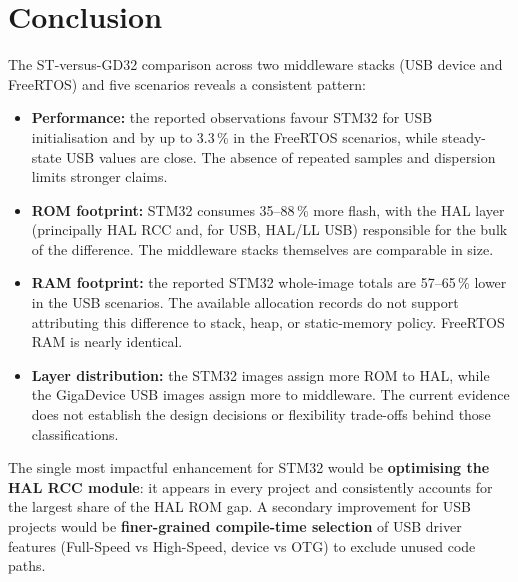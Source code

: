 \section*{Conclusion}

The ST-versus-GD32 comparison across two middleware stacks (USB device and FreeRTOS) and
five scenarios reveals a consistent pattern:

\begin{itemize}
  \item \textbf{Performance:} the reported observations favour STM32 for USB
    initialisation and by up to 3.3\,\% in the FreeRTOS scenarios, while steady-state USB
    values are close. The absence of repeated samples and dispersion limits stronger claims.
  \item \textbf{ROM footprint:} STM32 consumes 35--88\,\% more flash, with the HAL layer
    (principally HAL RCC and, for USB, HAL/LL USB) responsible for the bulk of the
    difference. The middleware stacks themselves are comparable in size.
  \item \textbf{RAM footprint:} the reported STM32 whole-image totals are 57--65\,\% lower
    in the USB scenarios. The available allocation records do not support attributing this
    difference to stack, heap, or static-memory policy. FreeRTOS RAM is nearly identical.
  \item \textbf{Layer distribution:} the STM32 images assign more ROM to HAL, while the
    GigaDevice USB images assign more to middleware. The current evidence does not establish
    the design decisions or flexibility trade-offs behind those classifications.
\end{itemize}

The single most impactful enhancement for STM32 would be \textbf{optimising the HAL RCC
module}: it appears in every project and consistently accounts for the largest share of the
HAL ROM gap. A secondary improvement for USB projects would be \textbf{finer-grained
compile-time selection} of USB driver features (Full-Speed vs High-Speed, device vs OTG)
to exclude unused code paths.

\pagebreak